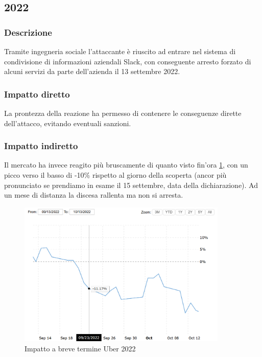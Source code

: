 \documentclass[12pt,a4paper,openright,twoside]{report}
\begin{document}
\subsection{2022}
\subsubsection{Descrizione}
Tramite ingegneria sociale l'attaccante \`e riuscito ad entrare nel sistema di condivisione di informazioni aziendali Slack, con conseguente arresto forzato di alcuni servizi da parte dell'azienda il 13 settembre 2022\cite{Uber_2022}.\\
\subsubsection{Impatto diretto}
La prontezza della reazione ha permesso di contenere le conseguenze dirette dell'attacco, evitando eventuali sanzioni.\\ 
\subsubsection{Impatto indiretto}
Il mercato ha invece reagito pi\`u bruscamente di quanto visto fin'ora \ref{fig:ubr1}, con un picco verso il basso di -10\% rispetto al giorno della scoperta (ancor pi\`u pronunciato se prendiamo in esame il 15 settembre, data della dichiarazione). Ad un mese di distanza la discesa rallenta ma non si arresta.\\

\begin{figure}[H] 
\begin{center} 
\includegraphics[width=10cm]{figures/uber_2022_short.png} 
\caption[Grafico Uber 2022 short]{Impatto a breve termine Uber 2022}\label{fig:ubr1}
\end{center}
\end{figure}
\end{document}
